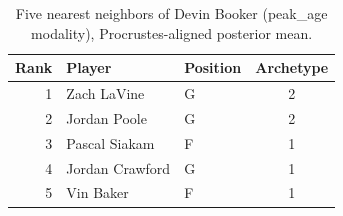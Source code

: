 \begin{table}[htbp]
  \centering\small
  \begin{tabular}{rllc}
    \toprule
    Rank & Player & Position & Archetype \\
    \midrule
    1 & Zach LaVine & G & 2 \\
    2 & Jordan Poole & G & 2 \\
    3 & Pascal Siakam & F & 1 \\
    4 & Jordan Crawford & G & 1 \\
    5 & Vin Baker & F & 1 \\
    \bottomrule
  \end{tabular}
  \caption{Five nearest neighbors of Devin Booker (peak_age modality), Procrustes-aligned posterior mean.}
  \label{tab:Devin_Booker_neighbors_peak_age}
\end{table}

